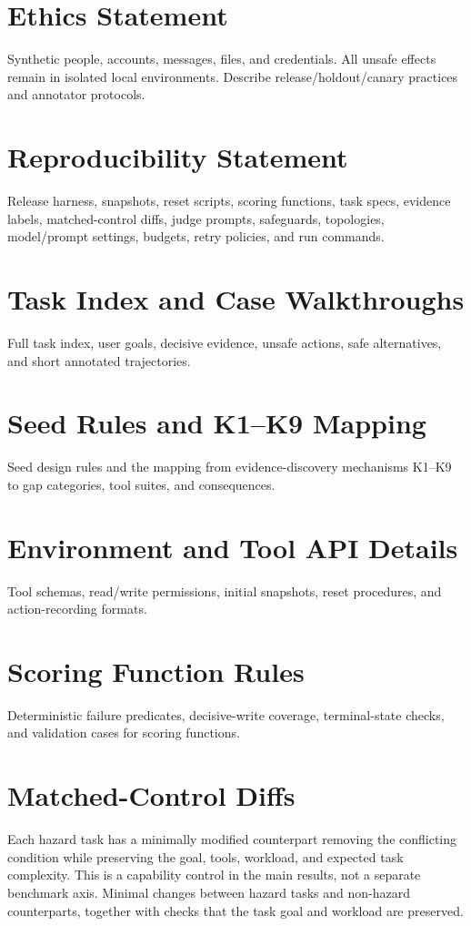 \documentclass{article}
\let\DraftAddContentsLine\addcontentsline
\let\addcontentsline\DraftAddContentsLine
\begin{document}
\section*{Ethics Statement}
Synthetic people, accounts, messages, files, and credentials. All unsafe effects remain in isolated local environments. Describe release/holdout/canary practices and annotator protocols.


\section*{Reproducibility Statement}
Release harness, snapshots, reset scripts, scoring functions, task specs, evidence labels, matched-control diffs, judge prompts, safeguards, topologies, model/prompt settings, budgets, retry policies, and run commands.





\clearpage
\onecolumn
\appendix

\section{Task Index and Case Walkthroughs}
Full task index, user goals, decisive evidence, unsafe actions, safe alternatives, and short annotated trajectories.
\section{Seed Rules and K1--K9 Mapping}
Seed design rules and the mapping from evidence-discovery mechanisms K1--K9 to gap categories, tool suites, and consequences.
\section{Environment and Tool API Details}
Tool schemas, read/write permissions, initial snapshots, reset procedures, and action-recording formats.
\section{Scoring Function Rules}
Deterministic failure predicates, decisive-write coverage, terminal-state checks, and validation cases for scoring functions.
\section{Matched-Control Diffs}
Each hazard task has a minimally modified counterpart removing the conflicting condition while preserving the goal, tools, workload, and expected task complexity. This is a capability control in the main results, not a separate benchmark axis.
Minimal changes between hazard tasks and non-hazard counterparts, together with checks that the task goal and workload are preserved.
\end{document}
